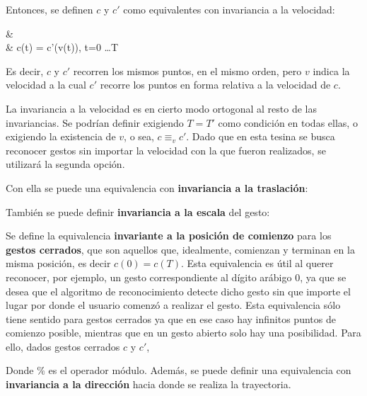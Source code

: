 
Entonces, se definen $c$ y $c'$ como equivalentes con invariancia a la velocidad:

{
& \existsv \\
&  c(t) = c'(v(t)), \; t=0 \dots T
}

Es decir, $c$ y $c'$ recorren los mismos puntos, en el mismo orden, pero $v$  indica la velocidad a la cual $c'$ recorre los puntos en forma relativa a la velocidad de $c$. 

La invariancia a la velocidad es en cierto modo ortogonal al resto de las invariancias. Se podrían definir exigiendo $T=T'$ como condición en todas ellas, o exigiendo la existencia de $v$, o sea, $c \equiv_v c'$. Dado que en esta tesina se busca reconocer gestos sin importar la velocidad con la que fueron realizados, se utilizará la segunda opción. 



Con ella se puede una equivalencia con \textbf{invariancia a la traslación}:






También se puede definir \textbf{invariancia a la escala} del gesto:

Se define la equivalencia \textbf{invariante a la posición de comienzo} para los \textbf{gestos cerrados}, que son aquellos que, idealmente, comienzan y terminan en la misma posición, es decir $c(0)=c(T)$. Esta equivalencia es útil al querer reconocer, por ejemplo, un gesto correspondiente al dígito arábigo $0$, ya que se desea que el algoritmo de reconocimiento detecte dicho gesto sin que importe el lugar por donde el usuario comenzó a realizar el gesto. Esta equivalencia sólo tiene sentido para gestos cerrados ya que en ese caso hay infinitos puntos de comienzo posible, mientras que en un gesto abierto solo hay una posibilidad. Para ello, dados gestos cerrados $c$ y $c'$, 

Donde $\%$ es el operador módulo. Además, se puede definir una equivalencia con \textbf{invariancia a la dirección} hacia donde se realiza la trayectoria.

